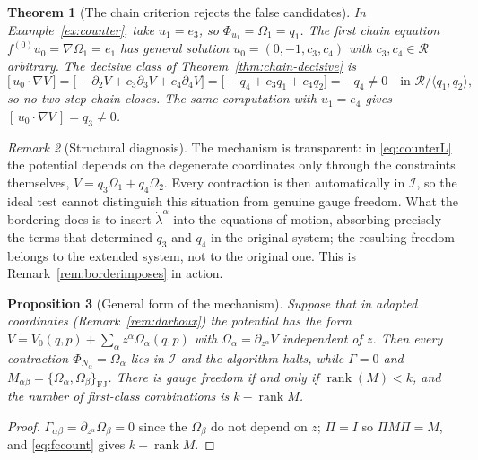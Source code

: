 \documentclass[12pt]{article}
\theoremstyle{plain}
\newtheorem{theorem}{Theorem}[section]
\newtheorem{proposition}[theorem]{Proposition}
\theoremstyle{definition}
\theoremstyle{remark}
\newtheorem{remark}[theorem]{Remark}
\DeclareMathOperator{\rank}{rank}
\newcommand{\pd}[1]{\partial_{#1}}
\newcommand{\Om}{\Omega}
\newcommand{\Ical}{\mathcal{I}}
\newcommand{\Rring}{\mathcal{R}}
\newcommand{\gen}[1]{\langle #1\rangle}
\newcommand{\FJ}{\mathrm{FJ}}
\begin{document}
	\begin{theorem}[The chain criterion rejects the false candidates]
		\label{thm:counterchain}
		In Example~\ref{ex:counter}, take $u_{1}=e_{3}$, so $\Phi_{u_{1}}=\Om_{1}=q_{1}$.
		The first chain equation $f^{(0)}u_{0}=\nabla\Om_{1}=e_{1}$ has general solution
		$u_{0}=(0,-1,c_{3},c_{4})$ with $c_{3},c_{4}\in\Rring$ arbitrary. The decisive
		class of Theorem~\ref{thm:chain-decisive} is
		\begin{equation}
			\bigl[\,u_{0}\cdot\nabla V\,\bigr]
			=\bigl[-\pd{2}V+c_{3}\pd{3}V+c_{4}\pd{4}V\bigr]
			=\bigl[-q_{4}+c_{3}q_{1}+c_{4}q_{2}\bigr]
			=-q_{4}\neq0
			\quad\text{in }\Rring/\gen{q_{1},q_{2}},
			\label{eq:counterclass}
		\end{equation}
		so no two-step chain closes. The same computation with $u_{1}=e_{4}$ gives
		$[\,u_{0}\cdot\nabla V\,]=q_{3}\neq0$.
	\end{theorem}
	
	\begin{remark}[Structural diagnosis]
		\label{rem:diagnosis}
		The mechanism is transparent: in \eqref{eq:counterL} the potential depends on the
		degenerate coordinates only through the constraints themselves,
		$V=q_{3}\Om_{1}+q_{4}\Om_{2}$. Every contraction is then automatically in
		$\Ical$, so the ideal test cannot distinguish this situation from genuine gauge
		freedom. What the bordering does is to insert $\dot\lambda^{\alpha}$ into the
		equations of motion, absorbing precisely the terms that determined $q_{3}$ and
		$q_{4}$ in the original system; the resulting freedom belongs to the extended
		system, not to the original one. This is
		Remark~\ref{rem:borderimposes} in action.
	\end{remark}
	
	\begin{proposition}[General form of the mechanism]
		\label{prop:mechanism}
		Suppose that in adapted coordinates (Remark~\ref{rem:darboux}) the potential has
		the form $V=V_{0}(q,p)+\sum_{\alpha}z^{\alpha}\Om_{\alpha}(q,p)$ with
		$\Om_{\alpha}=\pd{z^{\alpha}}V$ independent of $z$. Then every contraction
		$\Phi_{N_{\alpha}}=\Om_{\alpha}$ lies in $\Ical$ and the algorithm halts, while
		$\Gamma=0$ and $M_{\alpha\beta}=\{\Om_{\alpha},\Om_{\beta}\}_{\FJ}$. There is
		gauge freedom if and only if $\rank(M)<k$, and the number of first-class
		combinations is $k-\rank M$.
	\end{proposition}
	
	\begin{proof}
		$\Gamma_{\alpha\beta}=\pd{z^{\alpha}}\Om_{\beta}=0$ since the $\Om_{\beta}$ do
		not depend on $z$; $\Pi=I$ so $\Pi M\Pi=M$, and \eqref{eq:fccount} gives
		$k-\rank M$.
	\end{proof}
	
\end{document}
